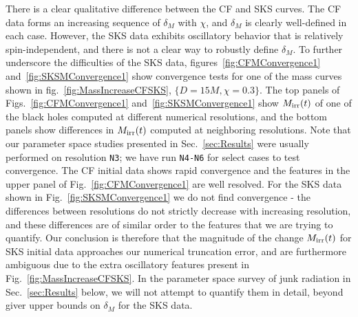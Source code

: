 There is a clear qualitative difference between the CF and SKS
curves. The CF data forms an increasing sequence of
$\delta_M$ with $\chi$, and $\delta_M$ is clearly well-defined in each
case. However, the SKS data exhibits oscillatory behavior that is
relatively spin-independent, and there is not a clear way to robustly
define $\delta_M$. To further underscore the difficulties of the SKS
data, figures~\ref{fig:CFMConvergence1} and~\ref{fig:SKSMConvergence1}
show convergence tests for one of the mass curves shown in
fig.~\ref{fig:MassIncreaseCFSKS}, $\{D=15M,\chi=0.3\}$. The top panels
of Figs.~\ref{fig:CFMConvergence1} and~\ref{fig:SKSMConvergence1} show
$M_{\rm irr}(t)$ of one of the black holes computed at different
numerical resolutions, and the bottom panels show differences in
$M_{\rm irr}(t)$ computed at neighboring resolutions. Note that our
parameter space studies presented in Sec.~\ref{sec:Results} were
usually performed on resolution {\tt N3}; we have run {\tt N4-N6} for
select cases to test convergence. The CF initial data shows rapid
convergence and the features in the upper panel of
Fig.~\ref{fig:CFMConvergence1} are well resolved. For the SKS data
shown in Fig.~\ref{fig:SKSMConvergence1} we do not find convergence -
the differences between resolutions do not strictly decrease with
increasing resolution, and these differences are of similar order to
the features that we are trying to quantify. Our conclusion is
therefore that the magnitude of the change $M_{\rm irr}(t)$ 
for SKS initial data approaches our numerical truncation error, and are
furthermore ambiguous due to the extra oscillatory features present in
Fig.~\ref{fig:MassIncreaseCFSKS}. In the parameter space survey of junk radiation in Sec.~\ref{sec:Results} below, we will not attempt to
quantify them in detail, beyond giver upper bounds on $\delta_M$ for
the SKS data.

